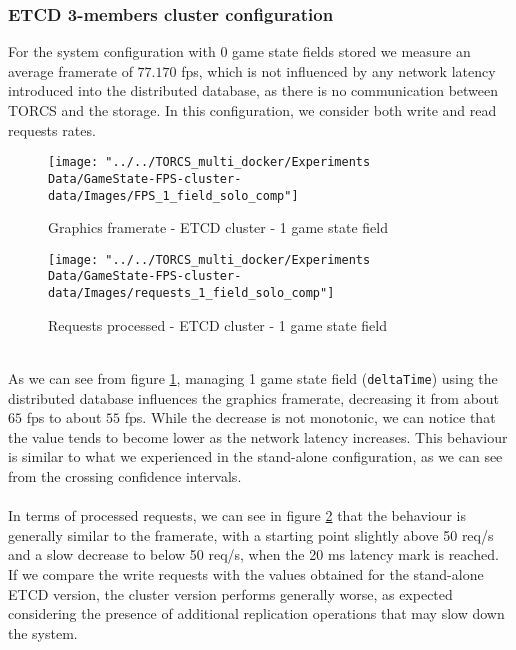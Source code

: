\subsubsection{ETCD 3-members cluster configuration}
For the system configuration with 0 game state fields stored we measure an average framerate of $77.170$ fps, which is not influenced by any network latency introduced into the distributed database, as there is no communication between TORCS and the storage. In this configuration, we consider both write and read requests rates. \\
\begin{figure}[h!]
	\centering
	\texttt{[image: "../../TORCS\_multi\_docker/Experiments Data/GameState-FPS-cluster-data/Images/FPS\_1\_field\_solo\_comp"]}
	\caption[Graphics framerate - ETCD cluster - 1 game state field]{Graphics framerate - ETCD cluster - 1 game state field}
	\label{fig:fps-1-field-etcd-cluster}
\end{figure}
\begin{figure}[h!]
	\centering
	\texttt{[image: "../../TORCS\_multi\_docker/Experiments Data/GameState-FPS-cluster-data/Images/requests\_1\_field\_solo\_comp"]}
	\caption[Requests processed - ETCD cluster - 1 game state field]{Requests processed - ETCD cluster - 1 game state field}
	\label{fig:requests-1-field-etcd-cluster}
\end{figure}
\\ As we can see from figure \ref{fig:fps-1-field-etcd-cluster}, managing 1 game state field (\texttt{deltaTime}) using the distributed database influences the graphics framerate, decreasing it from about $65$ fps to about $55$ fps. While the decrease is not monotonic, we can notice that the value tends to become lower as the network latency increases. This behaviour is similar to what we experienced in the stand-alone configuration, as we can see from the crossing confidence intervals. \\ \\
In terms of processed requests, we can see in figure \ref{fig:requests-1-field-etcd-cluster} that the behaviour is generally similar to the framerate, with a starting point slightly above 50 req/s and a slow decrease to below 50 req/s, when the 20 ms latency mark is reached. If we compare the write requests with the values obtained for the stand-alone ETCD version, the cluster version performs generally worse, as expected considering the presence of additional replication operations that may slow down the system. \\
